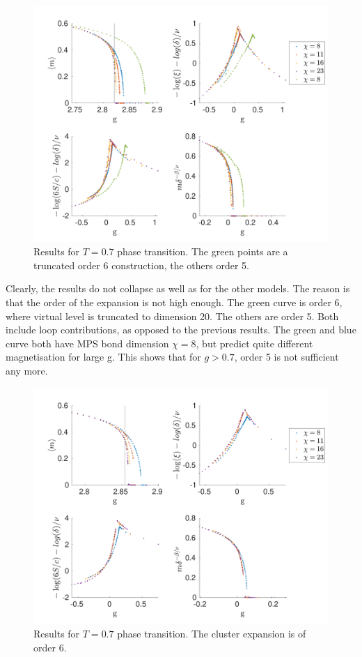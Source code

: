 \begin{figure}[H]
    \center
    \includegraphics[width=\textwidth]{Figuren/phasediag/t07/full.pdf}
    \caption{Results for $T=0.7$ phase transition. The green points are a truncated order 6 construction, the others order 5.  }
    \label{fig:phase:t07:full}
\end{figure}

Clearly, the results do not collapse as well as for the other models. The reason is that the order of the expansion is not high enough. The green curve is order 6, where virtual level is truncated to dimension 20. The others are order 5. Both include loop contributions, as opposed to the previous results. The green and blue curve both have MPS bond dimension $\chi=8$, but predict quite different magnetisation for large g. This shows that for $g>0.7$, order 5 is not sufficient any more.

\begin{figure}[H]
    \center
    \includegraphics[width=\textwidth]{Figuren/phasediag/t07/zoomed2.pdf}
    \caption{Results for $T=0.7$ phase transition. The cluster expansion is of order 6.}
    \label{fig:phase:t07:full2}
\end{figure}

